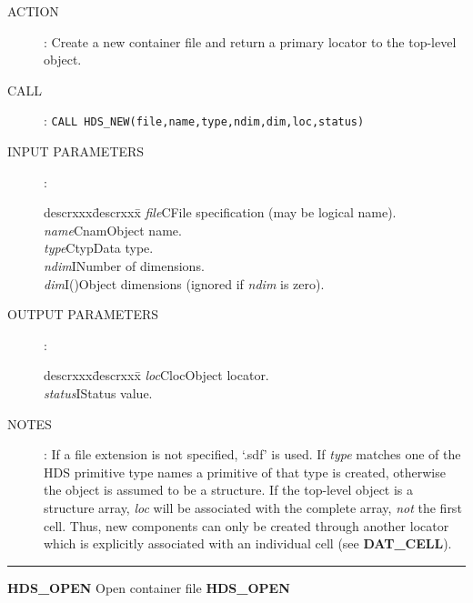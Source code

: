 \begin{description}
\item [ACTION]:
Create a new container file and return a primary locator to the top-level
object.
\item [CALL]:
{\tt CALL HDS\_NEW(file,name,type,ndim,dim,loc,status)}
\item [INPUT PARAMETERS]:
\begin{tabbing}
descrxxx\=descrxxx\=\kill
{\em file}\>C\>File specification (may be logical name).\\
{\em name}\>Cnam\>Object name.\\
{\em type}\>Ctyp\>Data type.\\
{\em ndim}\>I\>Number of dimensions.\\
{\em dim}\>I()\>Object dimensions (ignored if {\em ndim} is zero).
\end{tabbing}
\item [OUTPUT PARAMETERS]:
\begin{tabbing}
descrxxx\=descrxxx\=\kill
{\em loc}\>Cloc\>Object locator.\\
{\em status}\>I\>Status value.
\end{tabbing}
\item [NOTES]:
If a file extension is not specified, `.sdf' is used.
If {\em type} matches one of the HDS primitive type names a primitive of that
type is created, otherwise the object is assumed to be a structure.
If the top-level object is a structure array, {\em loc} will be associated with
the complete array, {\em not} the first cell.
Thus, new components can only be created through another locator which
is explicitly associated with an individual cell (see {\bf DAT\_CELL}).
\end{description}
\goodbreak
\rule{\textwidth}{0.3mm}
{\Large {\bf HDS\_OPEN} \hfill Open container file \hfill {\bf HDS\_OPEN}}
